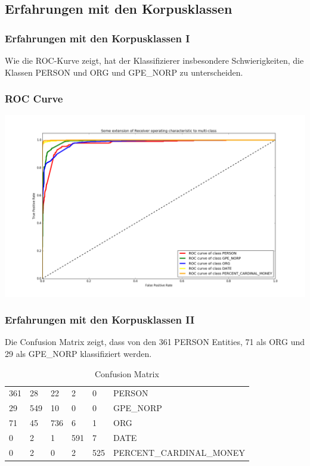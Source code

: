 \documentclass{beamer}
\begin{document}
	\subsection{Erfahrungen mit den Korpusklassen}
	\begin{frame}
		\frametitle{Erfahrungen mit den Korpusklassen I}
		Wie die ROC-Kurve zeigt, hat der Klassifizierer insbesondere Schwierigkeiten, die Klassen PERSON und ORG und GPE\_NORP zu unterscheiden.\\
	\end{frame}
	\begin{frame}
		\frametitle{ROC Curve}
		\includegraphics[scale=0.3]{roc_curve.png}
	\end{frame}
		\begin{frame}
			\frametitle{Erfahrungen mit den Korpusklassen II}
			Die Confusion Matrix zeigt, dass von den 361 PERSON Entities, 71 als ORG und 29 als GPE\_NORP klassifiziert werden. 
			\begin{table}
				\caption{Confusion Matrix}
				\begin{tabularx}{\textwidth}{llllll}
					\toprule
					361 & 28 & 22 & 2 & 0 & PERSON\\
					29 & 549 & 10 & 0 & 0 & GPE\_NORP\\
					71 & 45 & 736 & 6 & 1 & ORG\\
					0 & 2 & 1 & 591 & 7 & DATE\\
					0 & 2 & 0 & 2 & 525 & PERCENT\_CARDINAL\_MONEY\\
					\bottomrule
				\end{tabularx}
				\label{tab:allf2}
			\end{table}			
		\end{frame}
\end{document}

